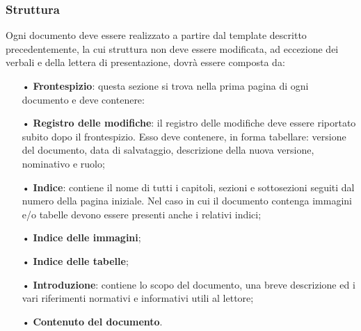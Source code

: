 \subsubsection{Struttura}
Ogni documento deve essere realizzato a partire dal template descritto precedentemente, la cui struttura non deve essere modificata, ad eccezione dei verbali e della lettera di presentazione, dovrà essere composta da:
\begin{itemize}
\item[•] \textbf{Frontespizio}: questa sezione si trova nella prima pagina di ogni documento e deve contenere:
\item[•] \textbf{Registro delle modifiche}: il registro delle modifiche deve essere riportato subito dopo il frontespizio. Esso deve contenere, in forma tabellare: versione del documento, data di salvataggio, descrizione della nuova versione, nominativo e ruolo;
\item[•] \textbf{Indice}: contiene il nome di tutti i capitoli, sezioni e sottosezioni seguiti dal numero della pagina iniziale. Nel caso in cui il documento contenga immagini e/o tabelle devono essere presenti anche i relativi indici;
\item[•] \textbf{Indice delle immagini};
\item[•] \textbf{Indice delle tabelle};
\item[•] \textbf{Introduzione}: contiene lo scopo del documento, una breve descrizione ed i vari riferimenti normativi e informativi utili al lettore;
\item[•] \textbf{Contenuto del documento}.
\end{itemize}



